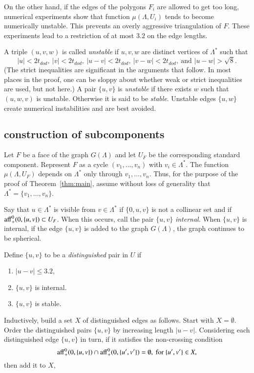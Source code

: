 \documentclass{article} %
\begin{document}
On the other hand, if the edges of the polygons $F_i$ are allowed
to get too long, numerical experiments show that function $\mu(\Lambda,U_i)$
tends to become numerically unstable.  This prevents 
an overly aggressive  triangulation of $F$.
These experiments lead
 to a restriction of at most $3.2$ on the edge lengths.

A triple $(u,v,w)$ is called {\it unstable}
if $u,v,w$ are distinct vertices of $\Lambda^*$ such
that 
$$
|u| < 2t_{dod},\ |v| < 2 t_{dod},\ |u-v|< 2t_{dod},\  |v-w|< 2t_{dod},\ \text{and } |u-w|>\sqrt8.$$  
(The 
strict inequalities are significant in the arguments that follow.
In most places in the proof, one can be sloppy about whether
weak or strict inequalities are used, but not here.)
A pair $\{u,v\}$ is {\it unstable} if there exists $w$ such that $(u,w,v)$
is unstable.  Otherwise it is said to be {\it stable}.
Unstable edges $\{u,w\}$ create
 numerical instabilities and are best avoided.


\subsection{construction of subcomponents}\label{sec:sub}

Let $F$ be a face of the graph $G(\Lambda)$ and let $U_F$ be the
corresponding standard component.  Represent $F$ as a cycle
$(v_1,\ldots,v_n)$ with $v_i\in\Lambda^*$.  The function
$\mu(\Lambda,U_F)$ depends  on $\Lambda^*$ only through
$v_1,\ldots,v_n$.  Thus, for the purpose of the proof of
Theorem~\ref{thm:main},  assume without loss of generality
that $\Lambda^* = \{v_1,\ldots,v_n\}$.

Say that $u\in\Lambda^*$ is visible from $v\in\Lambda^*$ if
$\{0,u,v\}$ is not a collinear set and if
${\operatorname{aff}}_+^0(0,\{u,v\})\subset U_F$.  When this occurs, 
call the pair $\{u,v\}$ {\it internal}.  When $\{u,v\}$
is  internal, if the edge $\{u,v\}$ is added to the
graph $G(\Lambda)$, the graph continues to be spherical.

Define $\{u,v\}$ to be a {\it distinguished} pair in $U$ if
\begin{enumerate}
\item  $|u-v|\le3.2$, 
\item $\{u,v\}$ is internal.
\item  $\{u,v\}$ is stable.
\end{enumerate}  

Inductively, build a set $X$ of distinguished edges as follows.
Start with $X=\emptyset$.
Order the distinguished pairs $\{u,v\}$ by increasing
length $|u-v|$.  Considering each
distinguished edge $\{u,v\}$ in turn,
if it satisfies
the non-crossing condition
  $$
  {\operatorname{aff}}_+^0(0,\{u,v\}) \cap {\operatorname{aff}}_+^0(0,\{u',v'\}) = \emptyset,
  \text{ for } \{u',v'\}\in X,
$$
then add it to $X$, 
\end{document}
